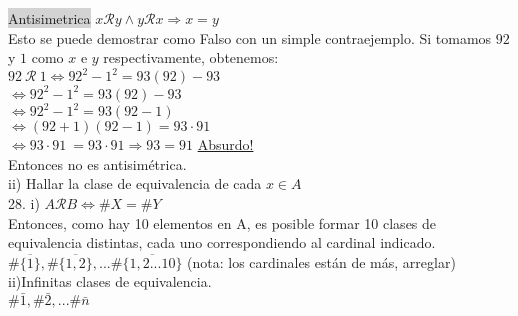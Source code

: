 \documentclass[a4paper,11pt]{article}
\begin{document}
\colorbox{lightgray}{Antisimetrica} \(x \mathcal{R}y \land y\mathcal{R}x \Rightarrow x=y\)\\
Esto se puede demostrar como Falso con un simple contraejemplo.
Si tomamos \(92\) y \(1\) como \(x\) e \(y\) respectivamente, obtenemos:\\
\(92\: \mathcal{R}\:1 \Leftrightarrow 92^2 - 1^2 = 93(92) - 93\)\\
\(\Leftrightarrow 92^2 - 1^2 = 93(92) - 93\)\\
\(\Leftrightarrow 92^2 - 1^2 = 93(92-1)\)\\
\(\Leftrightarrow (92+1)(92-1) = 93\cdot 91\)\\
\(\Leftrightarrow 93\cdot 91\ = 93\cdot 91 \Rightarrow 93 = 91\) \underline{Absurdo!}\\
Entonces no es antisimétrica.\\
ii) Hallar la clase de equivalencia de cada \(x \in A\) \\
28. i) \(A \mathcal{R} B \Leftrightarrow \#X = \#Y\)\\
Entonces, como hay 10 elementos en A, es posible formar 10 clases de equivalencia distintas, cada uno correspondiendo al cardinal indicado. \\
\(\#\overline{\{1\}}, \#\overline{\{1,2\}}, ... \#\overline{\{1,2...10\}}\) (nota: los cardinales están de más, arreglar)\\
ii)Infinitas clases de equivalencia. \\
\(\#\bar{1}, \#\bar{2}, ... \#\bar{n}\)
\end{document}
